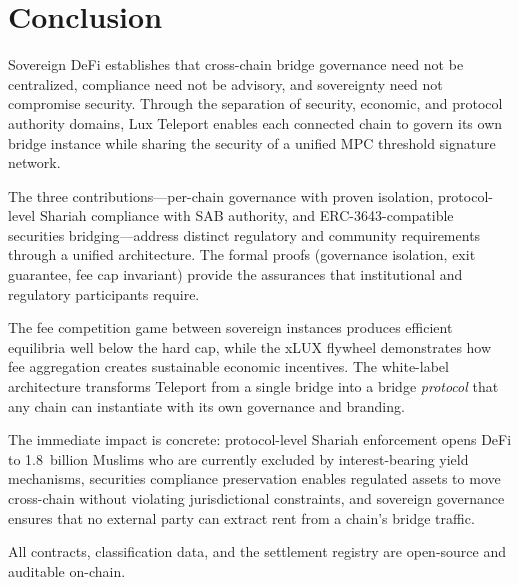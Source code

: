 \section{Conclusion}

\label{sec:conclusion}

Sovereign DeFi establishes that cross-chain bridge governance need not be centralized, compliance need not be advisory, and sovereignty need not compromise security. Through the separation of security, economic, and protocol authority domains, Lux Teleport enables each connected chain to govern its own bridge instance while sharing the security of a unified MPC threshold signature network.

The three contributions---per-chain governance with proven isolation, protocol-level Shariah compliance with SAB authority, and ERC-3643-compatible securities bridging---address distinct regulatory and community requirements through a unified architecture. The formal proofs (governance isolation, exit guarantee, fee cap invariant) provide the assurances that institutional and regulatory participants require.

The fee competition game between sovereign instances produces efficient equilibria well below the hard cap, while the xLUX flywheel demonstrates how fee aggregation creates sustainable economic incentives. The white-label architecture transforms Teleport from a single bridge into a bridge \emph{protocol} that any chain can instantiate with its own governance and branding.

The immediate impact is concrete: protocol-level Shariah enforcement opens DeFi to 1.8~billion Muslims who are currently excluded by interest-bearing yield mechanisms, securities compliance preservation enables regulated assets to move cross-chain without violating jurisdictional constraints, and sovereign governance ensures that no external party can extract rent from a chain's bridge traffic.

All contracts, classification data, and the settlement registry are open-source and auditable on-chain.

